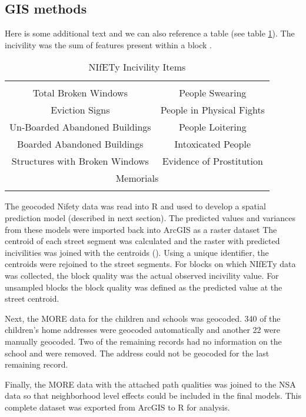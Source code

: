 \subsection*{GIS methods}

Here is some additional text and we can also reference a table (see table \ref{Ta:a_table}).  The incivility was the sum of features present within a block \cite{costa_case_2017}.

\begin{table}
\begin{center}
\caption{NIfETy Incivility Items}
\begin{tabular}{cc}
  \hline \\
Total Broken Windows &People Swearing \\
Eviction Signs &People in Physical Fights \\
Un-Boarded Abandoned Buildings  &People Loitering \\
Boarded Abandoned Buildings &Intoxicated People \\
Structures with Broken Windows &Evidence of Prostitution \\
\multicolumn{2}{c}{Memorials}\\ \\
  \hline
\end{tabular}
\label{Ta:a_table}
\end{center}
\end{table}

The geocoded Nifety data was read into R and used to develop a spatial prediction model (described in next section).  The predicted values and variances from these models were imported back into ArcGIS as a raster dataset
The centroid of each street segment was calculated and the raster with predicted incivilities was joined with the centroids (\cite{costa_bayesian_2018}).  Using a unique identifier, the centroids were rejoined to the street segments.  For blocks on which NIfETy data was collected, the block quality was the actual observed incivility value. For unsampled blocks the block quality was defined as the predicted value at the street centroid.

Next, the MORE data for the children and schools was geocoded. 340 of the children's home addresses were geocoded automatically and another 22 were manually geocoded. Two of the remaining records had no information on the school and were removed. The address could not be geocoded for the last remaining record.

Finally, the MORE data with the attached path qualities was joined to the NSA data so that neighborhood level effects could be included in the final models.  This complete dataset was exported from ArcGIS to R for analysis.

